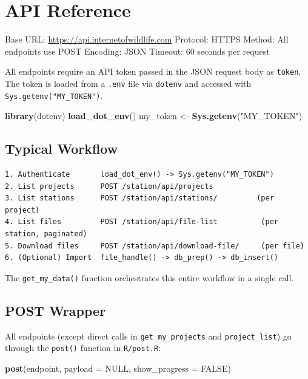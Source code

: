 \documentclass[
]{book}
\newenvironment{Shaded}{\begin{snugshade}}{\end{snugshade}}
\newcommand{\AttributeTok}[1]{\textcolor[rgb]{0.13,0.29,0.53}{#1}}
\newcommand{\ConstantTok}[1]{\textcolor[rgb]{0.56,0.35,0.01}{#1}}
\newcommand{\FunctionTok}[1]{\textcolor[rgb]{0.13,0.29,0.53}{\textbf{#1}}}
\newcommand{\NormalTok}[1]{#1}
\newcommand{\OtherTok}[1]{\textcolor[rgb]{0.56,0.35,0.01}{#1}}
\newcommand{\StringTok}[1]{\textcolor[rgb]{0.31,0.60,0.02}{#1}}
\begin{document}
\chapter{API Reference}\label{api-reference}

Base URL: \url{https://api.internetofwildlife.com}
Protocol: HTTPS
Method: All endpoints use POST
Encoding: JSON
Timeout: 60 seconds per request

All endpoints require an API token passed in the JSON request body as \texttt{token}. The token is loaded from a \texttt{.env} file via \texttt{dotenv} and accessed with \texttt{Sys.getenv("MY\_TOKEN")}.

\begin{Shaded}
\begin{Highlighting}[]
\FunctionTok{library}\NormalTok{(dotenv)}
\FunctionTok{load\_dot\_env}\NormalTok{()}
\NormalTok{my\_token }\OtherTok{\textless{}{-}} \FunctionTok{Sys.getenv}\NormalTok{(}\StringTok{"MY\_TOKEN"}\NormalTok{)}
\end{Highlighting}
\end{Shaded}

\section{Typical Workflow}\label{typical-workflow}

\begin{verbatim}
1. Authenticate       load_dot_env() -> Sys.getenv("MY_TOKEN")
2. List projects      POST /station/api/projects
3. List stations      POST /station/api/stations/         (per project)
4. List files         POST /station/api/file-list          (per station, paginated)
5. Download files     POST /station/api/download-file/     (per file)
6. (Optional) Import  file_handle() -> db_prep() -> db_insert()
\end{verbatim}

The \texttt{get\_my\_data()} function orchestrates this entire workflow in a single call.

\section{POST Wrapper}\label{post-wrapper}

All endpoints (except direct calls in \texttt{get\_my\_projects} and \texttt{project\_list}) go through the \texttt{post()} function in \texttt{R/post.R}:

\begin{Shaded}
\begin{Highlighting}[]
\FunctionTok{post}\NormalTok{(endpoint, }\AttributeTok{payload =} \ConstantTok{NULL}\NormalTok{, }\AttributeTok{show\_progress =} \ConstantTok{FALSE}\NormalTok{)}
\end{Highlighting}
\end{Shaded}
\end{document}
